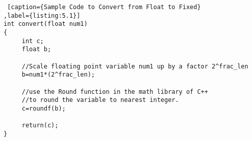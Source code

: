 \lstset{framesep=-10pt, xleftmargin=-10pt}
\begin{lstlisting} [caption={Sample Code to Convert from Float to Fixed}
,label={listing:5.1}]
int convert(float num1)
{
     int c;
     float b;
     
     //Scale floating point variable num1 up by a factor 2^frac_len
     b=num1*(2^frac_len);
     
     //use the Round function in the math library of C++ 
     //to round the variable to nearest integer.
     c=roundf(b);
     
     return(c);
}
\end{lstlisting}


